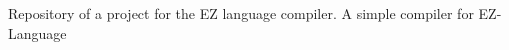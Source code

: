 \href{https://travis-ci.org/ezlanguage/ezlanguage}{\tt }

Repository of a project for the EZ language compiler. A simple compiler for E\+Z-\/\+Language 